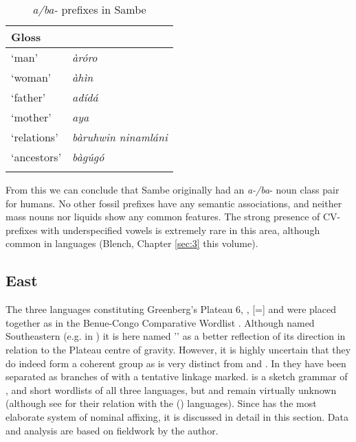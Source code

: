 \documentclass[output=paper]{langsci/langscibook}
\begin{document}
\begin{table}
\caption{\textit{a/ba-} prefixes in Sambe}
    \label{extab:nomaffplat:47} 
\begin{tabularx}{\textwidth}{Xl}
 \lsptoprule
Gloss 	&                        \ilit{Sambe}\\
\midrule
‘man’ 	&  \itshape àróro\\
‘woman’ 	&  \itshape àhìn\\
‘father’ 	&  \itshape adídá\\
‘mother’ 	&  \itshape aya\\
‘relations’ 	&  \itshape bàruhwin ninamláni\\
‘ancestors’ 	&  \itshape bàgúgó\\
\lspbottomrule
\end{tabularx}    
\end{table}

From this we can conclude that Sambe originally had an \textit{a-/ba}- noun class pair for humans. No other fossil prefixes have any semantic associations, and neither mass nouns nor liquids show any common features. The strong presence of CV- prefixes with underspecified vowels is extremely rare in this area, although common in  languages (Blench, Chapter \ref{sec:3} this volume).

\subsection{East}

The three languages constituting Greenberg’s Plateau 6, ,  [=] and  were placed together as  in the Benue-Congo Comparative Wordlist \citet{WilliamsonShimizu1968,Williamson1972}. Although named Southeastern (e.g. in \citealt{CrozierBlench1992}) it is here named '' as a better reflection of its direction in relation to the Plateau centre of gravity. However, it is highly uncertain that they do indeed form a coherent group as  is very distinct from  and . In  they have been separated as branches of  with a tentative linkage marked. \citet{Nettle1998a} is a sketch grammar of , and \citet{Nettle1998b} short wordlists of all three languages, but  and  remain virtually unknown (although see \citealt{Blench2003} for their relation with the  () languages). Since  has the most elaborate system of nominal affixing, it is discussed in detail in this section. Data and analysis are based on fieldwork by the author.
\end{document}
